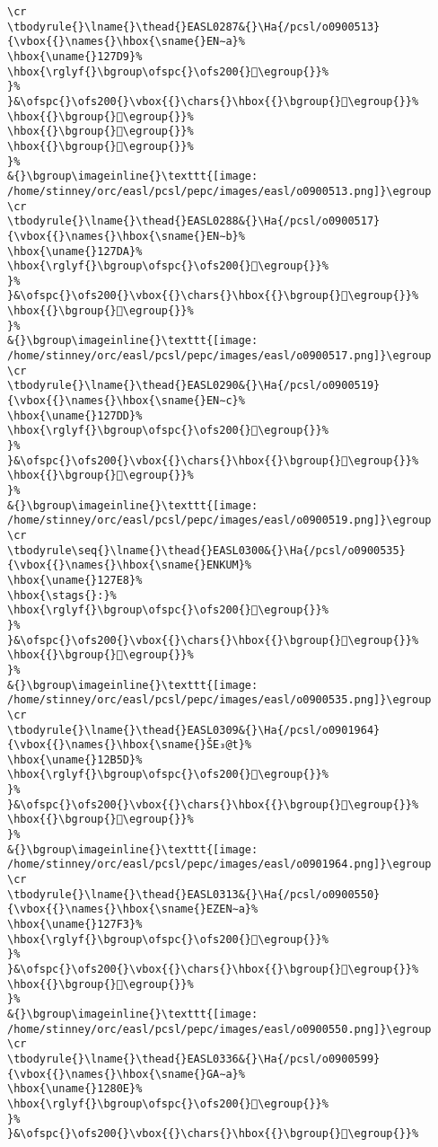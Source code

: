 \begin{verbatim}
\cr
\tbodyrule{}\lname{}\thead{}EASL0287&{}\Ha{/pcsl/o0900513}{\vbox{{}\names{}\hbox{\sname{}EN∼a}%
\hbox{\uname{}127D9}%
\hbox{\rglyf{}\bgroup\ofspc{}\ofs200{}𒟙\egroup{}}%
}%
}&\ofspc{}\ofs200{}\vbox{{}\chars{}\hbox{{}\bgroup{}𒟖\egroup{}}%
\hbox{{}\bgroup{}𒟗\egroup{}}%
\hbox{{}\bgroup{}𒟘\egroup{}}%
\hbox{{}\bgroup{}𒟙\egroup{}}%
}%
&{}\bgroup\imageinline{}\texttt{[image: /home/stinney/orc/easl/pcsl/pepc/images/easl/o0900513.png]}\egroup
\cr
\tbodyrule{}\lname{}\thead{}EASL0288&{}\Ha{/pcsl/o0900517}{\vbox{{}\names{}\hbox{\sname{}EN∼b}%
\hbox{\uname{}127DA}%
\hbox{\rglyf{}\bgroup\ofspc{}\ofs200{}𒟚\egroup{}}%
}%
}&\ofspc{}\ofs200{}\vbox{{}\chars{}\hbox{{}\bgroup{}𒟚\egroup{}}%
\hbox{{}\bgroup{}𒟜\egroup{}}%
}%
&{}\bgroup\imageinline{}\texttt{[image: /home/stinney/orc/easl/pcsl/pepc/images/easl/o0900517.png]}\egroup
\cr
\tbodyrule{}\lname{}\thead{}EASL0290&{}\Ha{/pcsl/o0900519}{\vbox{{}\names{}\hbox{\sname{}EN∼c}%
\hbox{\uname{}127DD}%
\hbox{\rglyf{}\bgroup\ofspc{}\ofs200{}𒟝\egroup{}}%
}%
}&\ofspc{}\ofs200{}\vbox{{}\chars{}\hbox{{}\bgroup{}𒟝\egroup{}}%
\hbox{{}\bgroup{}𒟟\egroup{}}%
}%
&{}\bgroup\imageinline{}\texttt{[image: /home/stinney/orc/easl/pcsl/pepc/images/easl/o0900519.png]}\egroup
\cr
\tbodyrule\seq{}\lname{}\thead{}EASL0300&{}\Ha{/pcsl/o0900535}{\vbox{{}\names{}\hbox{\sname{}ENKUM}%
\hbox{\uname{}127E8}%
\hbox{\stags{}:}%
\hbox{\rglyf{}\bgroup\ofspc{}\ofs200{}𒟨\egroup{}}%
}%
}&\ofspc{}\ofs200{}\vbox{{}\chars{}\hbox{{}\bgroup{}𒟨\egroup{}}%
\hbox{{}\bgroup{}𒟩\egroup{}}%
}%
&{}\bgroup\imageinline{}\texttt{[image: /home/stinney/orc/easl/pcsl/pepc/images/easl/o0900535.png]}\egroup
\cr
\tbodyrule{}\lname{}\thead{}EASL0309&{}\Ha{/pcsl/o0901964}{\vbox{{}\names{}\hbox{\sname{}ŠE₃@t}%
\hbox{\uname{}12B5D}%
\hbox{\rglyf{}\bgroup\ofspc{}\ofs200{}𒭝\egroup{}}%
}%
}&\ofspc{}\ofs200{}\vbox{{}\chars{}\hbox{{}\bgroup{}𒭛\egroup{}}%
\hbox{{}\bgroup{}𒭝\egroup{}}%
}%
&{}\bgroup\imageinline{}\texttt{[image: /home/stinney/orc/easl/pcsl/pepc/images/easl/o0901964.png]}\egroup
\cr
\tbodyrule{}\lname{}\thead{}EASL0313&{}\Ha{/pcsl/o0900550}{\vbox{{}\names{}\hbox{\sname{}EZEN∼a}%
\hbox{\uname{}127F3}%
\hbox{\rglyf{}\bgroup\ofspc{}\ofs200{}𒟳\egroup{}}%
}%
}&\ofspc{}\ofs200{}\vbox{{}\chars{}\hbox{{}\bgroup{}𒠁\egroup{}}%
\hbox{{}\bgroup{}𒟳\egroup{}}%
}%
&{}\bgroup\imageinline{}\texttt{[image: /home/stinney/orc/easl/pcsl/pepc/images/easl/o0900550.png]}\egroup
\cr
\tbodyrule{}\lname{}\thead{}EASL0336&{}\Ha{/pcsl/o0900599}{\vbox{{}\names{}\hbox{\sname{}GA∼a}%
\hbox{\uname{}1280E}%
\hbox{\rglyf{}\bgroup\ofspc{}\ofs200{}𒠎\egroup{}}%
}%
}&\ofspc{}\ofs200{}\vbox{{}\chars{}\hbox{{}\bgroup{}𒠊\egroup{}}%

\end{verbatim}
